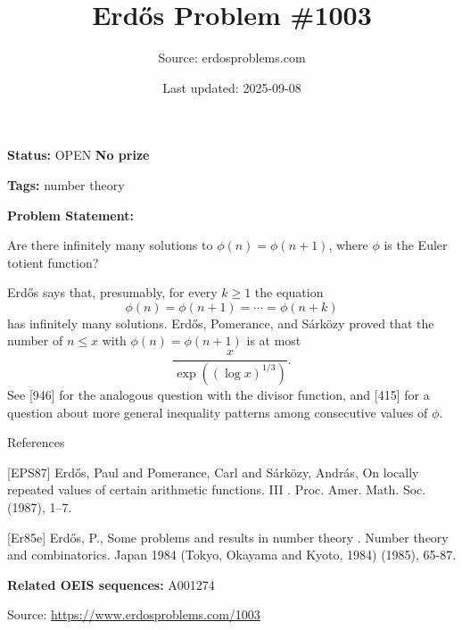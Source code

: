 \documentclass{article}
\title{Erd\H{o}s Problem \#1003}
\date{Last updated: 2025-09-08}
\author{Source: erdosproblems.com}
\begin{document}
\maketitle

\noindent\textbf{Status:} OPEN \quad \textbf{No prize}

\noindent\textbf{Tags:} number theory

\medskip

\noindent\textbf{Problem Statement:}

Are there infinitely many solutions to $\phi(n)=\phi(n+1)$, where $\phi$ is the Euler totient function?




Erd\H{o}s \cite{Er85e} says that, presumably, for every $k\geq 1$ the equation\[\phi(n)=\phi(n+1)=\cdots=\phi(n+k)\]has infinitely many solutions. Erd\H{o}s, Pomerance, and S\'{a}rk\"{o}zy \cite{EPS87} proved that the number of $n\leq x$ with $\phi(n)=\phi(n+1)$ is at most\[\frac{x}{\exp((\log x)^{1/3})}.\]See [946] for the analogous question with the divisor function, and [415] for a question about more general inequality patterns among consecutive values of $\phi$.




References

[EPS87] Erd\H{o}s, Paul and Pomerance, Carl and S\'{a}rk\"ozy, Andr\'{a}s, On locally repeated values of certain arithmetic functions. {III} . Proc. Amer. Math. Soc. (1987), 1--7.

[Er85e] Erd\H{o}s, P., Some problems and results in number theory . Number theory and combinatorics. Japan 1984 (Tokyo, Okayama and Kyoto, 1984) (1985), 65-87.

\noindent\textbf{Related OEIS sequences:} A001274


\bigskip
\noindent\small{Source: \url{https://www.erdosproblems.com/1003}}
\end{document}
